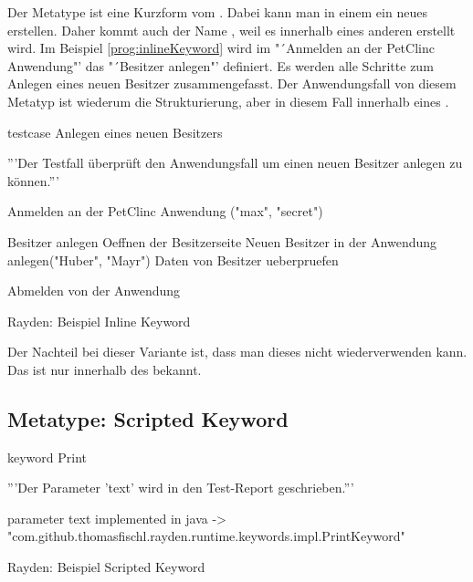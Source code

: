 Der Metatype  ist eine Kurzform vom . Dabei kann man in einem  ein neues  erstellen. Daher kommt auch der Name , weil es innerhalb eines anderen  erstellt wird. Im Beispiel \ref{prog:inlineKeyword} wird im  "´Anmelden an der PetClinc Anwendung"' das  "´Besitzer anlegen"' definiert. Es werden alle Schritte zum Anlegen eines neuen Besitzer zusammengefasst. Der Anwendungsfall von diesem Metatyp ist wiederum die Strukturierung, aber in diesem Fall innerhalb eines . 

\begin{program}
\begin{JavaCode}
testcase Anlegen eines neuen Besitzers {
	'''Der Testfall überprüft den Anwendungsfall um einen 
	   neuen Besitzer anlegen zu können.'''
	
	Anmelden an der PetClinc Anwendung ("max", "secret")
	
	Besitzer anlegen {
		Oeffnen der Besitzerseite		
		Neuen Besitzer in der Anwendung anlegen("Huber", "Mayr")
		Daten von Besitzer ueberpruefen
	}
	
	Abmelden von der Anwendung
}
\end{JavaCode}
\caption{Rayden: Beispiel Inline Keyword}
\label{prog:inlineKeyword}
\end{program}

\SuperPar
Der Nachteil bei dieser Variante ist, dass man dieses  nicht wiederverwenden kann. Das  ist nur innerhalb des  bekannt.


\subsection{Metatype: Scripted Keyword}

\begin{program}
\begin{JavaCode}
keyword Print {
	'''Der Parameter 'text' wird in den Test-Report geschrieben.'''
	
	parameter text
	implemented in java -> "com.github.thomasfischl.rayden.runtime.keywords.impl.PrintKeyword"
}
\end{JavaCode}
\caption{Rayden: Beispiel Scripted Keyword}
\label{prog:scriptedKeyword}
\end{program}

